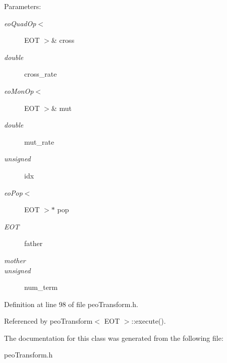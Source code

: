 \begin{Desc}
\item[Parameters:]
\begin{description}
\item[{\em eo\-Quad\-Op$<$}]EOT $>$\& cross \item[{\em double}]cross\_\-rate \item[{\em eo\-Mon\-Op$<$}]EOT $>$\& mut \item[{\em double}]mut\_\-rate \item[{\em unsigned}]idx \item[{\em eo\-Pop$<$}]EOT $>$$\ast$ pop \item[{\em EOT}]father \item[{\em mother}]\item[{\em unsigned}]num\_\-term \end{description}
\end{Desc}


Definition at line 98 of file peo\-Transform.h.

Referenced by peo\-Transform$<$ EOT $>$::execute().

The documentation for this class was generated from the following file:\begin{CompactItemize}
\item 
peo\-Transform.h\end{CompactItemize}
